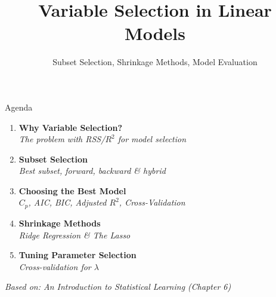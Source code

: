 \documentclass[ignorenonframetext,]{beamer}
\title{Variable Selection in Linear Models}
\subtitle{Subset Selection, Shrinkage Methods, Model Evaluation}
\begin{document}
\frame{\titlepage}

\begin{frame}{Agenda}
\begin{enumerate}
	\item \textbf{Why Variable Selection?}\\
	{\small\emph{The problem with RSS/$R^2$ for model selection}}
	\item \textbf{Subset Selection}\\
	{\small\emph{Best subset, forward, backward \& hybrid}}
	\item \textbf{Choosing the Best Model}\\
	{\small\emph{$C_p$, AIC, BIC, Adjusted $R^2$, Cross-Validation}}
	\item \textbf{Shrinkage Methods}\\
	{\small\emph{Ridge Regression \& The Lasso}}
	\item \textbf{Tuning Parameter Selection}\\
	{\small\emph{Cross-validation for $\lambda$}}
\end{enumerate}

\vfill
{\footnotesize\emph{Based on: An Introduction to Statistical Learning (Chapter 6)}}
\end{frame}
\end{document}
